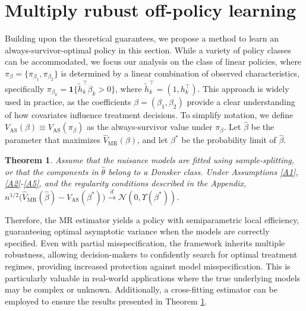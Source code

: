 \documentclass{article}
\newcommand{\wh}{\widehat}
\newcommand{\supp}{\textrm{Appendix}}
\newtheorem{theorem}{Theorem}
\begin{document}
	
%
%
\section{Multiply rubust off-policy learning}
Building upon the theoretical guarantees, we propose a method to learn an always-survivor-optimal policy in this section. 
While a variety of policy classes can be accommodated, we focus our analysis on the class of linear policies, where $\pi_\beta = \{\pi_{\beta_1}, \pi_{\beta_2}\}$ is determined by a linear combination of observed characteristics, specifically $\pi_{\beta_k} = \mathbf{1}\{\tilde{h}_k^\top \beta_k > 0\}$, where $\tilde{h}_k^\top = (1, h_k^\top)$. 
This approach is widely used in practice, as the coefficients $\beta=(\beta_1, \beta_2)$ provide a clear understanding of how covariates influence treatment decisions. 
To simplify notation, we define $V_{\text{AS}}(\beta) \equiv V_{\text{AS}}(\pi_\beta)$ as the always-survivor value under $\pi_\beta$. Let $\hat{\beta}$ be the parameter that maximizes $\wh{V}_{\text{MR}}(\beta)$, and let $\beta^*$ be the probability limit of $\hat{\beta}$.

	
	
\begin{theorem} \label{thm:5}
	Assume that the nuisance models are fitted using sample-splitting, or that the components in $\hat{\theta}$ belong to a Donsker class. Under Assumptions \ref{A1}, \ref{A2}-\ref{A5}, and the regularity conditions described in the \supp, %
	$n^{1/2} \big( \wh V_\text{MR}(\hat\beta) - V_\text{AS}(\beta^*) \big) \overset d\to \mathcal N\left(0, \Upsilon({\beta^*})\right)$.
\end{theorem}
%
Therefore, the MR estimator yields a policy with semiparametric local efficiency, guaranteeing optimal asymptotic variance when the models are correctly specified. 
Even with partial misspecification, the framework inherits multiple robustness, allowing decision-makers to confidently search for optimal treatment regimes, providing increased protection against model misspecification. This is particularly valuable in real-world applications where the true underlying models may be complex or unknown. 
Additionally, a cross-fitting estimator can be employed to ensure the results presented in Theorem \ref{thm:5}.


\end{document}
